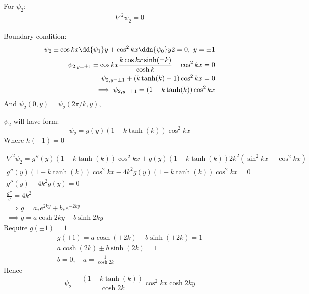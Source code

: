 \documentclass{/home/janmebows/Documents/LatexTemplates/myassignment}
\begin{document}
\begin{enumerate}
\begin{enumerate}
\begin{itemize}
        \end{itemize}

        For $\psi_2$:
        \begin{align*}
        \nabla^2 \psi_2= 0
        \end{align*}

        Boundary condition:
        \begin{align*}
            \psi_2 \pm \cos kx \dd{\psi_1}y + \cos^2kx \ddn{\psi_0} y2 = 0, \ y=\pm 1\\
            \psi_{2,y=\pm1} \pm \cos kx \frac{k \cos kx \sinh(\pm k)}{\cosh k} - \cos^2 kx=0\\
            \psi_{2,y=\pm1} +(k\tanh(k) - 1)\cos^2 kx=0\\
            \implies \psi_{2,y=\pm1} = (1 - k\tanh(k))\cos^2 kx
        \end{align*}
        And $\psi_2(0,y) = \psi_2 (2\pi/k,y)$, 

        $\psi_2$ will have form:
        \[\psi_2 = g(y) (1 - k\tanh(k))\cos^2 kx \]
        Where $h(\pm1) = 0$

        \begin{align*}
            \nabla^2 \psi_2 = g''(y) (1 - k\tanh(k))\cos^2 kx + g(y)(1-k\tanh(k))2k^2(\sin^2 kx - \cos^2 kx)\\
            g''(y) (1 - k\tanh(k))\cos^2 kx - 4k^2g(y)(1-k\tanh(k))\cos^2 kx=0\\
            g''(y) - 4k^2g(y)=0\\
            \frac{g''}g = 4k^2\\
            \implies g = a_*e^{2k y} + b_*e^{-2ky}\\
            \implies g = a\cosh 2ky + b \sinh 2ky
        \end{align*}
        Require $g(\pm1) = 1$
        \begin{align*}
            g(\pm1) =a\cosh (\pm2k) + b \sinh (\pm2k)=1\\
             a\cosh(2k) \pm b \sinh(2k) = 1\\
             b=0,\quad a = \frac{1}{\cosh 2k}
        \end{align*}
        Hence
        \[\boxed{\psi_2 =  \frac{(1 - k\tanh(k))}{\cosh2k} \cos^2 kx \cosh 2ky}\]


\end{enumerate}
\end{enumerate}
\end{document}
